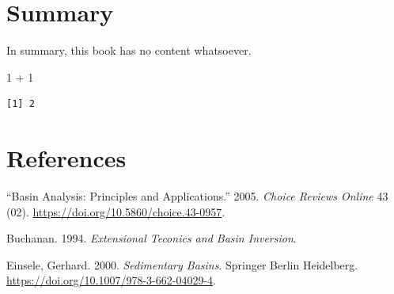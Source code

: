 \documentclass[
  letterpaper,
  DIV=11,
  numbers=noendperiod,
  oneside]{scrreprt}
\newenvironment{Shaded}{\begin{snugshade}}{\end{snugshade}}
\newcommand{\DecValTok}[1]{\textcolor[rgb]{0.68,0.00,0.00}{#1}}
\newcommand{\SpecialCharTok}[1]{\textcolor[rgb]{0.37,0.37,0.37}{#1}}
\newlength{\cslhangindent}
\newlength{\cslentryspacingunit} %
\newenvironment{CSLReferences}[2] %
 {%
  \setlength{\parindent}{0pt}
  \ifodd #1
  \let\oldpar\par
  \def\par{\hangindent=\cslhangindent\oldpar}
  \fi
  \setlength{\parskip}{#2\cslentryspacingunit}
 }%
 {}
\begin{document}

\hypertarget{summary}{%
\chapter{Summary}\label{summary}}

In summary, this book has no content whatsoever.

\begin{Shaded}
\begin{Highlighting}[]
\DecValTok{1} \SpecialCharTok{+} \DecValTok{1}
\end{Highlighting}
\end{Shaded}

\begin{verbatim}
[1] 2
\end{verbatim}


\hypertarget{references}{%
\chapter*{References}\label{references}}

\hypertarget{refs}{}
\begin{CSLReferences}{1}{0}
\leavevmode{}%
{``Basin Analysis: Principles and Applications.''} 2005. \emph{Choice
Reviews Online} 43 (02). \url{https://doi.org/10.5860/choice.43-0957}.

\leavevmode{}%
Buchanan. 1994. \emph{Extensional Teconics and Basin Inversion}.

\leavevmode{}%
Einsele, Gerhard. 2000. \emph{Sedimentary Basins}. Springer Berlin
Heidelberg. \url{https://doi.org/10.1007/978-3-662-04029-4}.

\end{CSLReferences}
\end{document}

